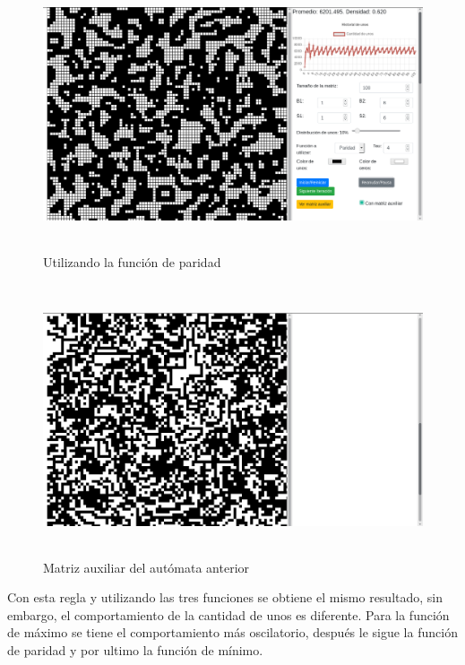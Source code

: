 \documentclass[12pt, titlepage]{article}
\begin{document}
\begin{figure}[H]
\begin{center}
 \includegraphics[width=15cm, height=8cm]{./img/1616-paridad.png}
 \caption{Utilizando la función de paridad}
 \label{fig:1616-paridad}
\end{center}
\end{figure}

\begin{figure}[H]
\begin{center}
 \includegraphics[width=15cm, height=8cm]{./img/1616-paridad-aux.png}
 \caption{Matriz auxiliar del autómata anterior}
 \label{fig:1616-paridad-aux}
\end{center}
\end{figure}
Con esta regla y utilizando las tres funciones se obtiene el mismo resultado, sin embargo, el comportamiento de la cantidad de unos es diferente. Para la función de máximo se tiene el comportamiento más oscilatorio, después le sigue la función de paridad y por ultimo la función de mínimo. 
\end{document}
